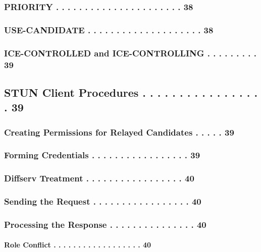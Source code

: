 \documentclass{article}
\begin{document}
\subsubsection{PRIORITY  . . . . . . . . . . . . . . . . . . . . . .  38}

\subsubsection{USE-CANDIDATE . . . . . . . . . . . . . . . . . . . .  38}

\subsubsection{ICE-CONTROLLED and ICE-CONTROLLING  . . . . . . . . .  39}

\subsection{STUN Client Procedures  . . . . . . . . . . . . . . . . .  39}

\subsubsection{Creating Permissions for Relayed Candidates . . . . .  39}

\subsubsection{Forming Credentials . . . . . . . . . . . . . . . . .  39}

\subsubsection{Diffserv Treatment  . . . . . . . . . . . . . . . . .  40}

\subsubsection{Sending the Request . . . . . . . . . . . . . . . . .  40}

\subsubsection{Processing the Response . . . . . . . . . . . . . . .  40}

\paragraph{Role Conflict . . . . . . . . . . . . . . . . . .  40}
\end{document}
